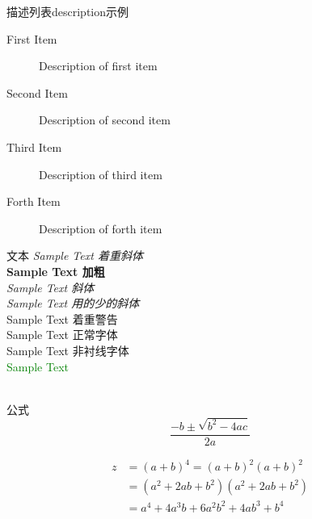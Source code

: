 \documentclass[11pt]{beamer} %
\begin{document}
	\begin{frame}[c]{描述列表description示例}
	\begin{description}  %
		\item[First Item] Description of first item
		\item[Second Item] Description of second item
		\item[Third Item] Description of third item
		\item[Forth Item] Description of forth item
	\end{description}
	\end{frame}
	
	\begin{frame}[c]{文本}
	\emph{Sample Text 着重斜体}	\\	  %
	\textbf{Sample Text 加粗}	\\	%
	\textit{Sample Text 斜体}	\\	%
	\textsl{Sample Text 用的少的斜体}\\	%
	\alert{Sample Text 着重警告}\\		%
	\textrm{Sample Text 正常字体}\\	%
	\textsf{Sample Text 非衬线字体}\\	%
	\textcolor{green}{Sample Text}\\
	\\ %
	\end{frame}

	\begin{frame}[c]{公式}
	\begin{equation}
	\frac{{- b \pm \sqrt {{b^2} - 4ac} }}{2a}
	\end{equation}
	
	\begin{align}  %
	z&=(a+b)^4=(a+b)^2(a+b)^2 \nonumber \\ %
	&=(a^2+2ab+b^2)(a^2+2ab+b^2)\nonumber \\
	&=a^4+4a^3b+6a^2b^2+4ab^3+b^4		
	\end{align}
	\end{frame}

	
\end{document}
